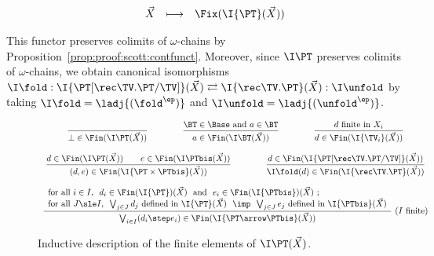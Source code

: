\begin{itemize}
\[\begin{array}{l l r c l}
&
& \vec X
& \longmapsto
& \Fix (\I{\PT}(\vec X))
\end{array}
\]

\noindent
This functor preserves colimits of $\omega$-chains by
Proposition~\ref{prop:proof:scott:contfunct}.
%
Moreover, since $\I\PT$ preserves
colimits of $\omega$-chains,
we obtain canonical isomorphisms
\(
  \I\fold
  :
  \I{\PT[\rec \TV.\PT/\TV]}(\vec X)
  \rightleftarrows
  \I{\rec \TV.\PT}(\vec X)
  :
  \I\unfold
\)
by taking
$\I\fold = \ladj{(\fold^\ep)}$
and
$\I\unfold = \ladj{(\unfold^\ep)}$.
\end{itemize}



\begin{figure}[t!]
\[
\begin{array}{c}

\dfrac{}
  {\bot \in \Fin(\I\PT(\vec X))}  


\qquad\qquad

\dfrac{\text{$\BT \in \Base$ and $a \in \BT$}}
  {a \in \Fin(\I\BT(\vec X))}

\qquad\qquad

\dfrac{\text{$d$ finite in $X_i$}}
  {d \in \Fin(\I{\TV_i}(\vec X))}

\\\\

\dfrac{d \in \Fin(\I\PT(\vec X))
  \qquad
  e \in \Fin(\I\PTbis(\vec X))}
  {(d,e) \in \Fin(\I{\PT \times \PTbis}(\vec X))}

\qquad\qquad

\dfrac{d \in \Fin(\I{\PT[\rec\TV.\PT/\TV]}(\vec X))}
  {\I\fold(d) \in \Fin(\I{\rec\TV.\PT}(\vec X))}

\\\\

\dfrac{\begin{array}{l}
  \text{for all $i \in I$,~
  $d_i \in \Fin(\I{\PT})(\vec X)$
  ~and~
  $e_i \in \Fin(\I{\PTbis})(\vec X)$ \@;}
  \\
  \text{for all $J \sle I$,~
  $\bigvee_{j \in J} d_j$ defined in $\I{\PT}(\vec X)$
  ~$\imp$~
  $\bigvee_{j \in J} e_j$ defined in $\I{\PTbis}(\vec X)$}
  \end{array}}
  {\bigvee_{i \in I}(d_i \step e_i) \in \Fin(\I{\PT \arrow \PTbis}(\vec X))}
~(\text{$I$ finite})

\end{array}
\]
\caption{Inductive description of the finite elements of $\I\PT(\vec X)$.%
\label{fig:proof:sem:finelt}}
\end{figure}

